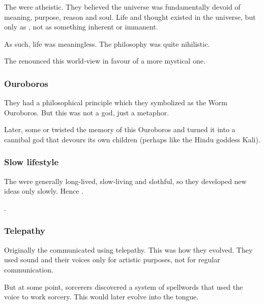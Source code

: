 The \ophidians were atheistic. 
They believed the universe was fundamentally devoid of meaning, purpose, reason and soul.
Life and thought existed in the universe, but only as , not as something inherent or immanent. 

As such, life was meaningless. 
The \ophidian philosophy was quite nihilistic. 

The  renounced this world-view in favour of a more mystical one.





\subsubsection{Ouroboros}
They had a philosophical principle which they symbolized as the Worm Ouroboros. 
But this was not a god, just a metaphor. 

Later, some  \ophidians or \quiljaaran twisted the memory of this Ouroboros and turned it into a cannibal god that devours its own children (perhaps like the Hindu goddess Kali). 





\subsubsection{Slow lifestyle}
The \ophidians were generally long-lived, slow-living and slothful, so they developed new ideas only slowly. 
Hence .

\Sethicus {}. 





\subsubsection{Telepathy}
Originally the \ophidians{} communicated using telepathy. 
This was how they evolved. 
They used sound and their voices only for artistic purposes, not for regular communication. 

But at some point, \ophidian{} sorcerers discovered a system of spellwords that used the voice to work sorcery. 
This would later evolve into the  tongue. 

